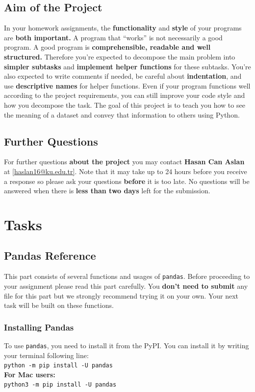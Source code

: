 \documentclass[a4paper]{article}
\makeatletter
\newcommand{\contactName}{Hasan Can Aslan}
\newcommand{\contactMail}{haslan16@ku.edu.tr}
\makeatother
\begin{document}
\subsection{Aim of the Project}
In your homework assignments, the \textbf{functionality} and \textbf{style} of your programs are \textbf{both important.}  A program that “works” is not necessarily a good program. A good program is \textbf{comprehensible, readable and well structured.} Therefore you’re expected to decompose the main problem into \textbf{simpler subtasks} and \textbf{implement helper functions} for these subtasks. You’re also expected to write comments if needed, be careful about \textbf{indentation}, and use \textbf{descriptive names} for helper functions. Even if your program functions well according to the project requirements, you can still improve your code style and how you decompose the task. The goal of this project is to teach you how to see the meaning of a dataset and convey that information to others using Python.

\subsection{Further Questions}
For further questions \textbf{about the project} you may contact \textbf{\contactName} at \href{mailto:\contactMail}{\mbox{[\contactMail]}}. Note that it may take up to 24 hours before you receive a response so please ask your questions \textbf{before} it is too late. No questions will be answered when there is \textbf{less than two days} left for the submission.

\section{Tasks}

\subsection{Pandas Reference}
This part consists of several functions and usages of \texttt{pandas}. Before proceeding to your assignment please read this part carefully. You \textbf{don't need to submit} any file for this part but we strongly recommend trying it on your own. Your next task will be built on these functions.

\subsubsection{Installing Pandas}
To use \texttt{pandas}, you need to install it from the PyPI. You can install it by writing your terminal following line: \\
\newline
\texttt{python -m pip install -U pandas} \\
\textbf{For Mac users:}\\
\texttt{python3 -m pip install -U pandas}
\end{document}
